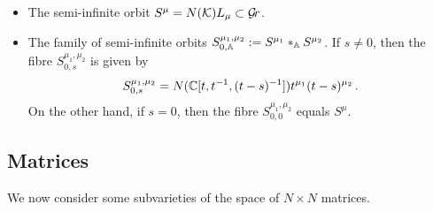 \documentclass[draft]{article}
\begin{document}
\begin{itemize}
    \item The semi-infinite orbit $ S^\mu = N(\cK)L_\mu \subset \Gr $.  
    \item The family of semi-infinite orbits $ S^{\mu_1, \mu_2}_{0,\AA} := S^{\mu_1} \ast_\AA S^{\mu_2}$.  If $ s \ne 0 $, then the fibre $S^{\mu_1, \mu_2}_{0,s} $ is given by
    $$
    S^{\mu_1, \mu_2}_{0,s} = N(\CC[t, t^{-1}, (t-s)^{-1}])t^{\mu_1} (t-s)^{\mu_2} \,. %
    $$
    On the other hand, if $ s = 0$, then the fibre $S^{\mu_1, \mu_2}_{0,0} $ equals $ S^\mu$.
    
    
\end{itemize}

\subsection{Matrices}
We now consider some subvarieties of the space of $ N\times N$ matrices. 

\end{document}
